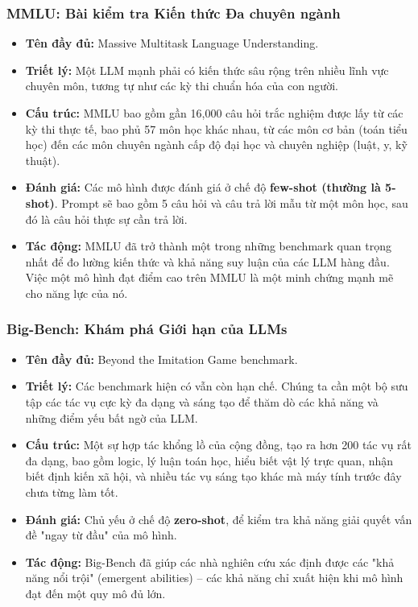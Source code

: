 \subsubsection{MMLU: Bài kiểm tra Kiến thức Đa chuyên ngành}
\begin{itemize}
    \item \textbf{Tên đầy đủ:} Massive Multitask Language Understanding.
    \item \textbf{Triết lý:} Một LLM mạnh phải có kiến thức sâu rộng trên nhiều lĩnh vực chuyên môn, tương tự như các kỳ thi chuẩn hóa của con người.
    \item \textbf{Cấu trúc:} MMLU bao gồm gần 16,000 câu hỏi trắc nghiệm được lấy từ các kỳ thi thực tế, bao phủ 57 môn học khác nhau, từ các môn cơ bản (toán tiểu học) đến các môn chuyên ngành cấp độ đại học và chuyên nghiệp (luật, y, kỹ thuật).
    \item \textbf{Đánh giá:} Các mô hình được đánh giá ở chế độ \textbf{few-shot (thường là 5-shot)}. Prompt sẽ bao gồm 5 câu hỏi và câu trả lời mẫu từ một môn học, sau đó là câu hỏi thực sự cần trả lời.
    \item \textbf{Tác động:} MMLU đã trở thành một trong những benchmark quan trọng nhất để đo lường kiến thức và khả năng suy luận của các LLM hàng đầu. Việc một mô hình đạt điểm cao trên MMLU là một minh chứng mạnh mẽ cho năng lực của nó.
\end{itemize}

\subsubsection{Big-Bench: Khám phá Giới hạn của LLMs}
\begin{itemize}
    \item \textbf{Tên đầy đủ:} Beyond the Imitation Game benchmark.
    \item \textbf{Triết lý:} Các benchmark hiện có vẫn còn hạn chế. Chúng ta cần một bộ sưu tập các tác vụ cực kỳ đa dạng và sáng tạo để thăm dò các khả năng và những điểm yếu bất ngờ của LLM.
    \item \textbf{Cấu trúc:} Một sự hợp tác khổng lồ của cộng đồng, tạo ra hơn 200 tác vụ rất đa dạng, bao gồm logic, lý luận toán học, hiểu biết vật lý trực quan, nhận biết định kiến xã hội, và nhiều tác vụ sáng tạo khác mà máy tính trước đây chưa từng làm tốt.
    \item \textbf{Đánh giá:} Chủ yếu ở chế độ \textbf{zero-shot}, để kiểm tra khả năng giải quyết vấn đề "ngay từ đầu" của mô hình.
    \item \textbf{Tác động:} Big-Bench đã giúp các nhà nghiên cứu xác định được các "khả năng nổi trội" (emergent abilities) -- các khả năng chỉ xuất hiện khi mô hình đạt đến một quy mô đủ lớn.
\end{itemize}

